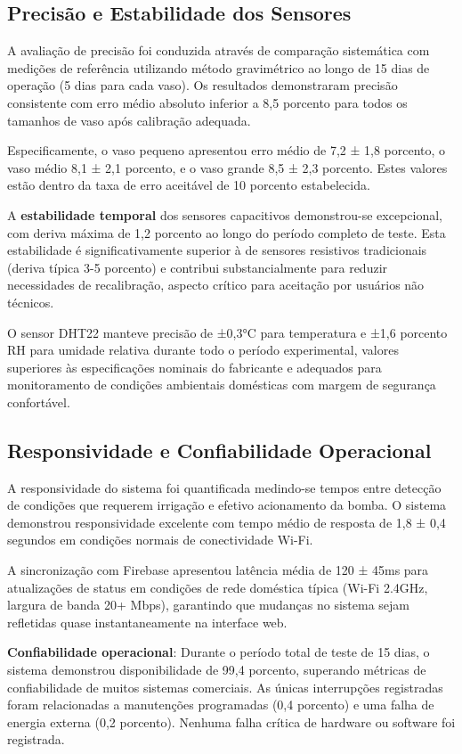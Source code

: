 \subsection{Precisão e Estabilidade dos Sensores}

A avaliação de precisão foi conduzida através de comparação sistemática com medições de referência utilizando método gravimétrico ao longo de 15 dias de operação (5 dias para cada vaso). Os resultados demonstraram precisão consistente com erro médio absoluto inferior a 8,5 porcento para todos os tamanhos de vaso após calibração adequada.

Especificamente, o vaso pequeno apresentou erro médio de 7,2 ± 1,8 porcento, o vaso médio 8,1 ± 2,1 porcento, e o vaso grande 8,5 ± 2,3 porcento. Estes valores estão dentro da taxa de erro aceitável de 10 porcento estabelecida.

A \textbf{estabilidade temporal} dos sensores capacitivos demonstrou-se excepcional, com deriva máxima de 1,2 porcento ao longo do período completo de teste. Esta estabilidade é significativamente superior à de sensores resistivos tradicionais (deriva típica 3-5 porcento) e contribui substancialmente para reduzir necessidades de recalibração, aspecto crítico para aceitação por usuários não técnicos.

O sensor DHT22 manteve precisão de ±0,3°C para temperatura e ±1,6 porcento RH para umidade relativa durante todo o período experimental, valores superiores às especificações nominais do fabricante e adequados para monitoramento de condições ambientais domésticas com margem de segurança confortável.

\subsection{Responsividade e Confiabilidade Operacional}

A responsividade do sistema foi quantificada medindo-se tempos entre detecção de condições que requerem irrigação e efetivo acionamento da bomba. O sistema demonstrou responsividade excelente com tempo médio de resposta de 1,8 ± 0,4 segundos em condições normais de conectividade Wi-Fi.

A sincronização com Firebase apresentou latência média de 120 ± 45ms para atualizações de status em condições de rede doméstica típica (Wi-Fi 2.4GHz, largura de banda 20+ Mbps), garantindo que mudanças no sistema sejam refletidas quase instantaneamente na interface web.

\textbf{Confiabilidade operacional}: Durante o período total de teste de 15 dias, o sistema demonstrou disponibilidade de 99,4 porcento, superando métricas de confiabilidade de muitos sistemas comerciais. As únicas interrupções registradas foram relacionadas a manutenções programadas (0,4 porcento) e uma falha de energia externa (0,2 porcento). Nenhuma falha crítica de hardware ou software foi registrada.

